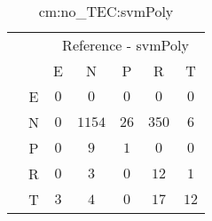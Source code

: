 \begin{table}[!ht]
	\centering
	\begin{tabular}{|c|c|c|c|c|c|c|}
		\cline{3-7}
		\multicolumn{2}{c|}{} & \multicolumn{5}{|c|}{Reference - svmPoly} \\ \cline{3-7}
		\multicolumn{2}{c|}{} & E & N & P & R & T \\ \hline
		\multirow{5}{*}{\rotatebox{90}{Prediction}} & E & $0$ & $0$ & $0$ & $0$ & $0$ \\ \cline{2-7}
		 & N & $0$ & $1154$ & $26$ & $350$ & $6$ \\ \cline{2-7}
		 & P & $0$ & $9$ & $1$ & $0$ & $0$ \\ \cline{2-7}
		 & R & $0$ & $3$ & $0$ & $12$ & $1$ \\ \cline{2-7}
		 & T & $3$ & $4$ & $0$ & $17$ & $12$ \\ \hline
	\end{tabular}
	\caption{cm:no_TEC:svmPoly}
	\label{tab:cm:no_TEC:svmPoly}
\end{table}
